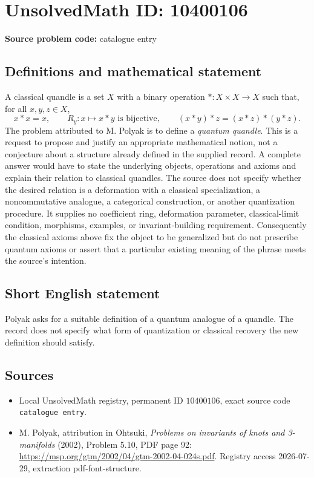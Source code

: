\documentclass[11pt]{article}
\begin{document}
\section*{UnsolvedMath ID: 10400106}
\textbf{Source problem code:} catalogue entry
\subsection{Definitions and mathematical statement}
A classical quandle is a set \(X\) with a binary operation \(*:X\times X\to X\) such that, for all \(x,y,z\in X\),
\[x*x=x,\qquad R_y:x\mapsto x*y\text{ is bijective},\qquad (x*y)*z=(x*z)*(y*z).\]
The problem attributed to M. Polyak is to define a \emph{quantum quandle}. This is a request to propose and justify an appropriate mathematical notion, not a conjecture about a structure already defined in the supplied record. A complete answer would have to state the underlying objects, operations and axioms and explain their relation to classical quandles. The source does not specify whether the desired relation is a deformation with a classical specialization, a noncommutative analogue, a categorical construction, or another quantization procedure. It supplies no coefficient ring, deformation parameter, classical-limit condition, morphisms, examples, or invariant-building requirement. Consequently the classical axioms above fix the object to be generalized but do not prescribe quantum axioms or assert that a particular existing meaning of the phrase meets the source's intention.
\subsection{Short English statement}
Polyak asks for a suitable definition of a quantum analogue of a quandle. The record does not specify what form of quantization or classical recovery the new definition should satisfy.
\subsection{Sources}
\begin{itemize}
\item Local UnsolvedMath registry, permanent ID \(10400106\), exact source code \texttt{catalogue entry}.
\item M. Polyak, attribution in Ohtsuki, \emph{Problems on invariants of knots and 3-manifolds} (2002), Problem 5.10, PDF page 92: \url{https://msp.org/gtm/2002/04/gtm-2002-04-024s.pdf}. Registry access 2026-07-29, extraction pdf-font-structure.
\end{itemize}
\end{document}
